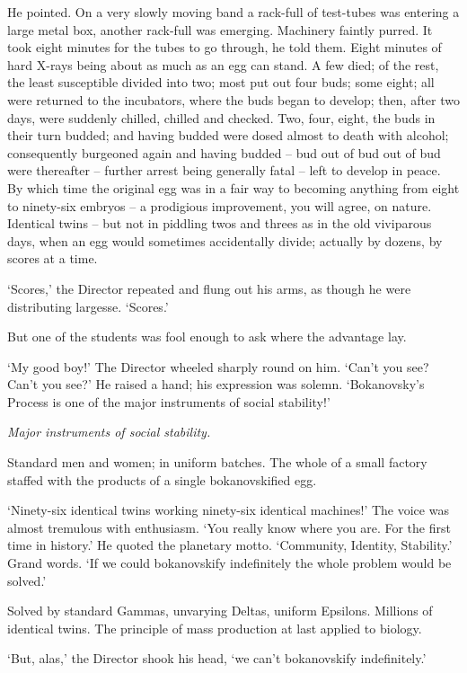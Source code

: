 \documentclass[12pt,a5paper]{book}
\newcommand{\sqm}[1]{‘#1’}
\begin{document}
He pointed. On a very slowly moving band a rack-full of test-tubes was entering a large metal box, another rack-full was emerging. Machinery faintly purred. It took eight minutes for the tubes to go through, he told them. Eight minutes of hard X-rays being about as much as an egg can stand. A few died; of the rest, the least susceptible divided into two; most put out four buds; some eight; all were returned to the incubators, where the buds began to develop; then, after two days, were suddenly chilled, chilled and checked. Two, four, eight, the buds in their turn budded; and having budded were dosed almost to death with alcohol; consequently burgeoned again and having budded – bud out of bud out of bud were thereafter – further arrest being generally fatal – left to develop in peace. By which time the original egg was in a fair way to becoming anything from eight to ninety-six embryos – a prodigious improvement, you will agree, on nature. Identical twins – but not in piddling twos and threes as in the old viviparous days, when an egg would sometimes accidentally divide; actually by dozens, by scores at a time.

\sqm{Scores,} the Director repeated and flung out his arms, as though he were distributing largesse. \sqm{Scores.}

But one of the students was fool enough to ask where the advantage lay.

\sqm{My good boy!} The Director wheeled sharply round on him. \sqm{Can't you see? Can't you see?} He raised a hand; his expression was solemn. \sqm{Bokanovsky's Process is one of the major instruments of social stability!}

\emph{Major instruments of social stability.}

Standard men and women; in uniform batches. The whole of a small factory staffed with the products of a single bokanovskified egg.

\sqm{Ninety-six identical twins working ninety-six identical machines!} The voice was almost tremulous with enthusiasm. \sqm{You really know where you are. For the first time in history.} He quoted the planetary motto. \sqm{Community, Identity, Stability.} Grand words. \sqm{If we could bokanovskify indefinitely the whole problem would be solved.}

Solved by standard Gammas, unvarying Deltas, uniform Epsilons. Millions of identical twins. The principle of mass production at last applied to biology.

\sqm{But, alas,} the Director shook his head, \sqm{we can't bokanovskify indefinitely.}
\end{document}
